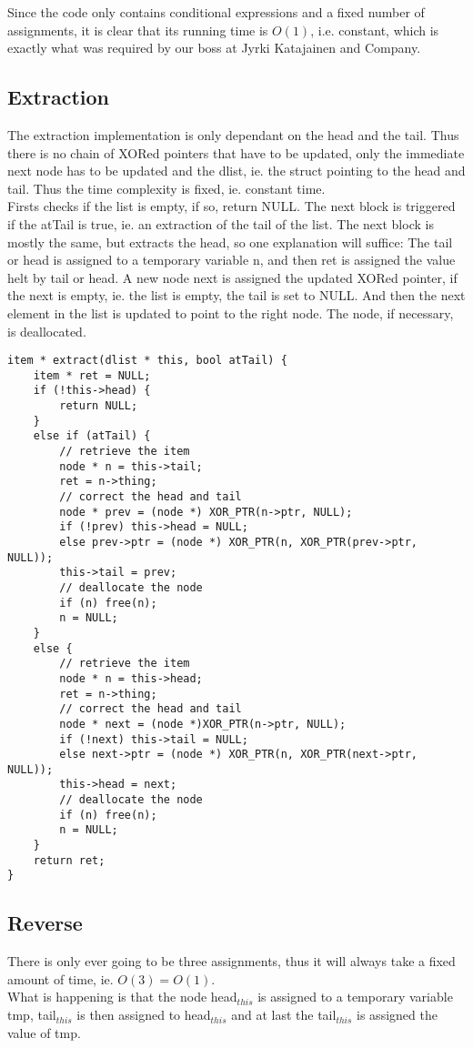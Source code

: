 \documentclass[11pt]{article}
\begin{document}
Since the code only contains conditional expressions and a fixed number of
assignments, it is clear that its running time is \(O(1)\), i.e. constant, which
is exactly what was required by our boss at Jyrki Katajainen and Company.

\subsection{Extraction}
The extraction implementation is only dependant on the head and the tail. Thus
there is no chain of XORed pointers that have to be updated, only the immediate 
next node has to be updated and the dlist, ie. the struct pointing to the head
and tail. Thus the time complexity is fixed, ie. constant time.\\
Firsts checks if the list is empty, if so, return NULL. The next block is
triggered if the atTail is true, ie. an extraction of the tail of the list. The
next block is mostly the same, but extracts the head, so one explanation will
suffice:
The tail or head is assigned to a temporary variable n, and then ret is assigned
the value helt by tail or head. A new node next is assigned the updated XORed
pointer, if the next is empty, ie. the list is empty, the tail is set to NULL. 
And then the next element in the list is updated to point to the right node.
The node, if necessary, is deallocated.
\begin{lstlisting}
item * extract(dlist * this, bool atTail) {
    item * ret = NULL;
    if (!this->head) {
        return NULL;
    }
    else if (atTail) {
        // retrieve the item
        node * n = this->tail;
        ret = n->thing;
        // correct the head and tail
        node * prev = (node *) XOR_PTR(n->ptr, NULL);
        if (!prev) this->head = NULL;
        else prev->ptr = (node *) XOR_PTR(n, XOR_PTR(prev->ptr, NULL));
        this->tail = prev;
        // deallocate the node
        if (n) free(n);
        n = NULL;
    }
    else {
        // retrieve the item
        node * n = this->head;
        ret = n->thing;
        // correct the head and tail
        node * next = (node *)XOR_PTR(n->ptr, NULL);
        if (!next) this->tail = NULL;
        else next->ptr = (node *) XOR_PTR(n, XOR_PTR(next->ptr, NULL));
        this->head = next;
        // deallocate the node
        if (n) free(n);
        n = NULL;
    }
    return ret;
}
\end{lstlisting}

\subsection{Reverse}
There is only ever going to be three assignments, thus it will always take a
fixed amount of time, ie. $O(3) = O(1)$.\\
What is happening is that the node head$_{this}$ is assigned to a temporary
variable tmp, tail$_{this}$ is then assigned to head$_{this}$ and at last the
tail$_{this}$ is assigned the value of tmp.
\end{document}
